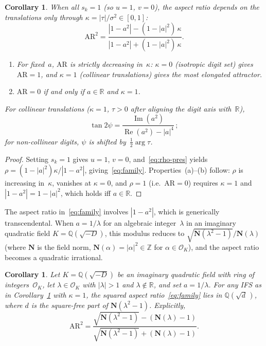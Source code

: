 \documentclass{amsart}
\newtheorem{corollary}[theorem]{Corollary}
\theoremstyle{definition}
\theoremstyle{remark}
\begin{document}
\begin{corollary}\label{cor:kappa}
When all $s_k = 1$ \textup{(}so $u=1$, $v=0$\textup{)},
the aspect ratio depends on the translations only through
$\kappa = |\tau|/\sigma^2 \in [0,1]$:
\begin{equation}\label{eq:family}
  \mathrm{AR}^2 = \frac{|1-a^2| - (1-|a|^2)\,\kappa}{|1-a^2| + (1-|a|^2)\,\kappa}.
\end{equation}
\begin{enumerate}[\upshape(a)]
\item For fixed~$a$, $\mathrm{AR}$ is strictly decreasing in~$\kappa$:
$\kappa=0$ \textup{(}isotropic digit set\textup{)} gives $\mathrm{AR}=1$,
and $\kappa=1$ \textup{(}collinear translations\textup{)} gives the
most elongated attractor.
\item $\mathrm{AR}=0$ if and only if $a \in \mathbb{R}$ and $\kappa=1$.
\end{enumerate}
For collinear translations \textup{(}$\kappa=1$,
$\tau>0$ after aligning the digit axis with~$\mathbb{R}$\textup{)},
\begin{equation}\label{eq:psi-simple}
  \tan 2\psi = \frac{\operatorname{Im}(a^2)}{\operatorname{Re}(a^2)-|a|^4}\,;
\end{equation}
for non-collinear digits, $\psi$ is shifted
by~$\tfrac{1}{2}\arg\tau$.
\end{corollary}

\begin{proof}
Setting $s_k=1$ gives $u=1$, $v=0$, and~\eqref{eq:rho-pres}
yields $\rho = (1-|a|^2)\kappa/|1-a^2|$,
giving~\eqref{eq:family}.
Properties~(a)--(b) follow:
$\rho$ is increasing in~$\kappa$,
vanishes at $\kappa=0$,
and $\rho=1$ (i.e.\ $\mathrm{AR}=0$) requires
$\kappa=1$ and $|1-a^2|=1-|a|^2$,
which holds iff $a \in \mathbb{R}$.
\end{proof}

The aspect ratio in~\eqref{eq:family} involves $|1-a^2|$, which is
generically transcendental.  When $a = 1/\lambda$ for an algebraic
integer~$\lambda$ in an imaginary quadratic field
$K = \mathbb{Q}(\sqrt{-D})$, this modulus reduces to
$\sqrt{\mathbf{N}(\lambda^2-1)}/\mathbf{N}(\lambda)$
(where $\mathbf{N}$ is the field norm,
$\mathbf{N}(\alpha)=|\alpha|^2\in\mathbb{Z}$ for
$\alpha\in\mathcal{O}_K$),
and the aspect ratio becomes a quadratic irrational.

\begin{corollary}\label{cor:field}
Let $K = \mathbb{Q}(\sqrt{-D})$ be an imaginary quadratic field
with ring of integers~$\mathcal{O}_K$,
let $\lambda \in \mathcal{O}_K$ with $|\lambda|>1$ and $\lambda\notin\mathbb{R}$,
and set $a = 1/\lambda$.  For any IFS as in Corollary~\textup{\ref{cor:kappa}}
with $\kappa=1$,
the squared aspect ratio~\eqref{eq:family} lies
in $\mathbb{Q}(\sqrt{d}\,)$,
where $d$ is the square-free part of $\mathbf{N}(\lambda^2-1)$.
Explicitly,
\begin{equation}\label{eq:field}
  \mathrm{AR}^2
  = \frac{\sqrt{\mathbf{N}(\lambda^2-1)} - (\mathbf{N}(\lambda)-1)}
         {\sqrt{\mathbf{N}(\lambda^2-1)} + (\mathbf{N}(\lambda)-1)}.
\end{equation}
\end{corollary}
\end{document}
